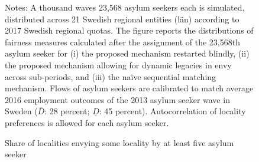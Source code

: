 \documentclass[12pt,fleqn]{article}
\begin{document}
\begin{figure}
	\caption{Share of localities envying some locality by at least five asylum seeker \label{FIG:quotas_fair1}}
	\begin{center}
	\end{center}
		{\scriptsize \vspace{-1em}
	\begin{singlespace}
		{\sc Notes:} A thousand waves 23,568 asylum seekers each is simulated, distributed across 21 Swedish regional entities (l\"{a}n) according to 2017 Swedish regional quotas. The figure reports the distributions of fairness measures calculated after the assignment of the 23,568th asylum seeker for (i) the proposed mechanism restarted blindly, (ii) the proposed mechanism allowing for dynamic legacies in envy across sub-periods, and (iii) the na\"{i}ve sequential matching mechanism. Flows of asylum seekers are calibrated to match average 2016 employment outcomes of the 2013 asylum seeker wave in Sweden ($\overline{D}$: 28 percent; $\underline{D}$: 45 percent). Autocorrelation of locality preferences is allowed for each asylum seeker.
	\end{singlespace}
	 }
\end{figure}
\begin{table}

\caption{Simulation for conjecture}
\label{TABLE:conjecture}
\end{table}
\end{document}
